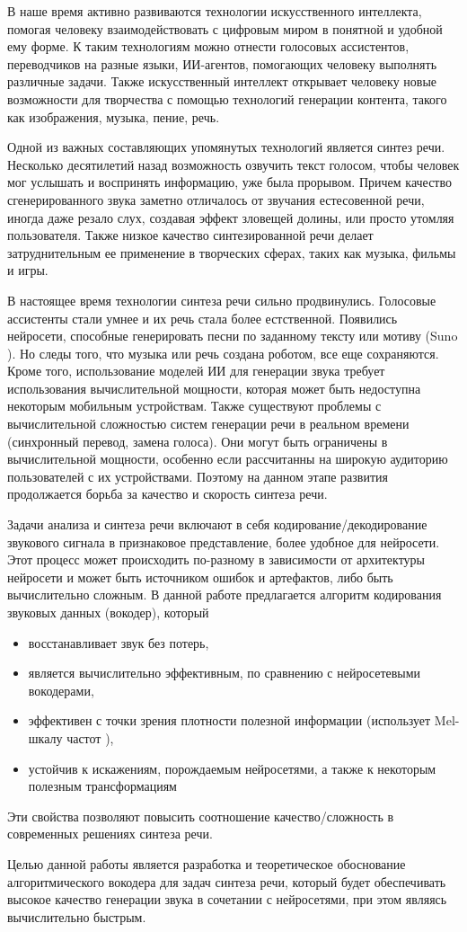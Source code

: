 \Introduction

В наше время активно развиваются технологии искусственного интеллекта, помогая человеку взаимодействовать с цифровым миром в понятной и удобной ему форме. 
К таким технологиям можно отнести голосовых ассистентов, переводчиков на разные языки, ИИ-агентов, помогающих человеку выполнять различные задачи.
Также искусственный интеллект открывает человеку новые возможности для творчества с помощью технологий генерации контента, такого как изображения, музыка, пение, речь.

Одной из важных составляющих упомянутых технологий является синтез речи. 
Несколько десятилетий назад возможность озвучить текст голосом, чтобы человек мог услышать и воспринять информацию, уже была прорывом. 
Причем качество сгенерированного звука заметно отличалось от звучания естесовенной речи, иногда даже резало слух, создавая эффект зловещей долины, или просто утомляя пользователя.
Также низкое качество синтезированной речи делает затруднительным ее применение в творческих сферах, таких как музыка, фильмы и игры.

В настоящее время технологии синтеза речи сильно продвинулись. Голосовые ассистенты стали умнее и их речь стала более естственной. 
Появились нейросети, способные генерировать песни по заданному тексту или мотиву (Suno \cite{SunoAI}). 
Но следы того, что музыка или речь создана роботом, все еще сохраняются.
Кроме того, использование моделей ИИ для генерации звука требует использования вычислительной мощности, которая может быть недоступна некоторым мобильным устройствам.
Также существуют проблемы с вычислительной сложностью систем генерации речи в реальном времени (синхронный перевод, замена голоса). 
Они могут быть ограничены в вычислительной мощности, особенно если рассчитанны на широкую аудиторию пользователей с их устройствами.
Поэтому на данном этапе развития продолжается борьба за качество и скорость синтеза речи.

Задачи анализа и синтеза речи включают в себя кодирование/декодирование звукового сигнала в признаковое представление, более удобное для нейросети.
Этот процесс может происходить по-разному в зависимости от архитектуры нейросети и может быть источником ошибок и артефактов, либо быть вычислительно сложным.
В данной работе предлагается алгоритм кодирования звуковых данных (вокодер), который 
\begin{itemize}
    \item восстанавливает звук без потерь, 
    \item является вычислительно эффективным, по сравнению с нейросетевыми вокодерами,
    \item эффективен с точки зрения плотности полезной информации (использует Mel-шкалу частот \cite{MelScale}),
    \item устойчив к искажениям, порождаемым нейросетями, а также к некоторым полезным трансформациям
\end{itemize}
Эти свойства позволяют повысить соотношение качество/сложность в современных решениях синтеза речи.

Целью данной работы является разработка и теоретическое обоснование алгоритмического вокодера для задач синтеза речи, который будет обеспечивать высокое качество генерации звука в сочетании с нейросетями, при этом являясь вычислительно быстрым.
